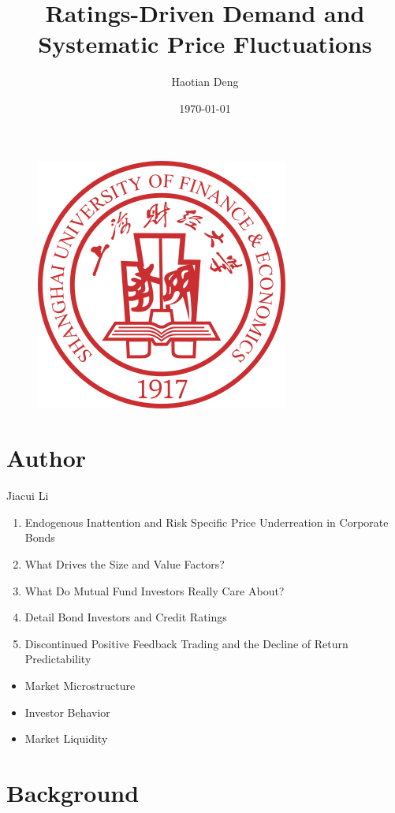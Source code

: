 \documentclass[UTF8, 16pt]{beamer}
\author[Haotian Deng] %
{
Haotian Deng
}
\title[Ratings-Driven Demand and Systematic Price Fluctuations]{Ratings-Driven Demand and \\ Systematic Price Fluctuations}
\institute[SUFE]
{
Shanghai University of Finance and Economics
}
\date[]
{\today}
\begin{document}
\begin{CJK*}{UTF8}{gbsn}

\begin{frame}[noframenumbering]
	\titlepage
	\vspace{-0.5cm}
    \begin{figure}[htpb] 
        \begin{center}
            \includegraphics[width=0.19 \linewidth]{sufe_logo.png}
        \end{center}  
    \end{figure}
\end{frame}


\section{Author}
\begin{frame}{Jiacui Li}
	\begin{enumerate}
		\item Endogenous Inattention and Risk Specific Price Underreation in Corporate Bonds
		\item What Drives the Size and Value Factors?
		\item What Do Mutual Fund Investors Really Care About?
		\item Detail Bond Investors and Credit Ratings
		\item Discontinued Positive Feedback Trading and the Decline of Return Predictability
	\end{enumerate}
	\begin{itemize}
		\item Market Microstructure
		\item Investor Behavior
		\item Market Liquidity
	\end{itemize}
\end{frame}

\section{Background}


\end{CJK*}
\end{document}
